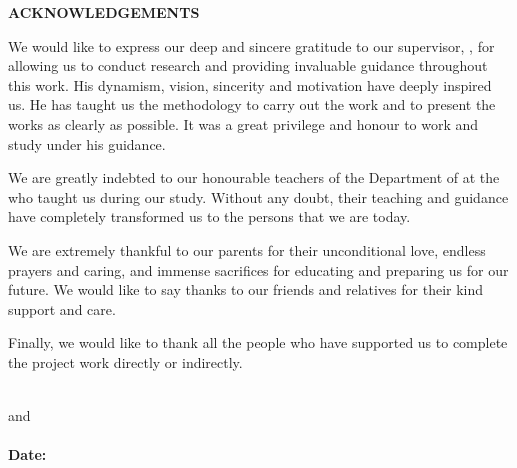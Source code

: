 \thispagestyle{plain}

\begin{center}
 \Large {\bf \uppercase{Acknowledgements}}
\end{center}

\vspace{3\baselineskip}

\noindent
We would like to express our deep and sincere gratitude to our supervisor, \emph{\Supervisor}, for allowing us to conduct research and providing invaluable guidance throughout this work. His dynamism, vision, sincerity and motivation have deeply inspired us. He has taught us the methodology to carry out the work and to present the works as clearly as possible. It was a great privilege and honour to work and study under his guidance. 

We are greatly indebted to our honourable teachers of the Department of  at the \University who taught us during our study. Without any doubt, their teaching and guidance have completely transformed us to the persons that we are today.

We are extremely thankful to our parents for their unconditional love, endless prayers and caring, and immense sacrifices for educating and preparing us for our future. We would like to say thanks to our friends and relatives for their kind support and care.

Finally, we would like to thank all the people who have supported us to complete the project work directly or indirectly.


\noindent
\vspace{\baselineskip} \\
\textit{\firstAuthor} and  \textit{\secondAuthor}\\
{\bf \University} \\
{\bf Date:} \reportSubmissionDate